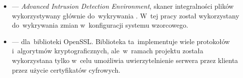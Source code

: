 \documentclass[thesis]{subfiles}
\begin{document}
\begin{itemize}
	\item {} --- \emph{Advanced Intrusion Detection Environment}, skaner integralności plików wykorzystywany głównie do~wykrywania . W~tej pracy został wykorzystany do~wykrywania zmian w~konfiguracji systemu wzorcowego.
	\item {} ---  dla~biblioteki OpenSSL. Biblioteka ta~implementuje wiele protokołów i~algorytmów kryptograficznych, ale~w~ramach projektu została wykorzystana tylko w~celu umożliwia uwierzytelnienie serwera przez klienta przez użycie certyfikatów cyfrowych.

\end{itemize}
\end{document}

